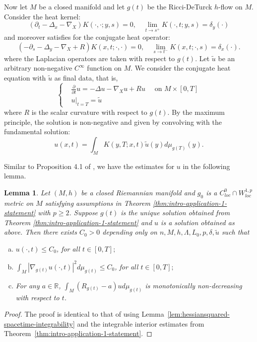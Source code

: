 \documentclass[12pt]{amsart}
\theoremstyle{plain}
\theoremstyle{plain}
\newtheorem{lemma}[subsection]{Lemma}
\theoremstyle{definition}
\theoremstyle{remark}
\numberwithin{equation}{subsection}
\newcommand{\del}{\nabla}
\begin{document}
Now let $M$ be a closed manifold and let $g(t)$ be the Ricci-DeTurck $h$-flow on $M$.
Consider the heat kernel:
\begin{equation*}
    \left(\partial_t - \Delta_x-\nabla_X\right)K(\cdot,\cdot;y,s) = 0, \quad \lim\limits_{t\to s^+}K(\cdot,t;y,s) = \delta_y(\cdot)
\end{equation*}
and moreover satisfies for the conjugate heat operator:
\begin{equation*}
    \left(-\partial_s - \Delta_y - \del_X + R\right)K(x,t;\cdot,\cdot) = 0, \quad \lim\limits_{s\to t^-}K(x,t;\cdot,s) = \delta_x(\cdot).
\end{equation*}
where the Laplacian operators are taken with respect to $g(t)$. Let $\tilde{u}$ be an arbitrary non-negative $C^\infty$ function on $M$. We consider the conjugate heat equation with $\tilde{u}$ as final data, that is,
\begin{equation}\label{eqn:conjugate-heat-eqn}
    \begin{cases}
        &\frac{\partial}{\partial t} u = -\Delta u - \del_X u + Ru \quad \text{ on } M \times[0,T] \\
        &u\big|_{t=T} = \tilde{u}
    \end{cases}
\end{equation}
where $R$ is the scalar curvature with respect to $g(t)$. By the maximum principle, the solution is non-negative and given by convolving with the fundamental solution:
\begin{equation*}
    u(x,t) = \int_M K(y,T;x,t)\tilde{u}(y)d\mu_{g(T)}(y).
\end{equation*}

Similar to Proposition 4.1 of \cite{jiang_weak_2021}, we have the estimates for $u$ in the following lemma.
\begin{lemma}\label{lem:conjugate-heat-equation-estimates}
    Let $(M,h)$ be a closed Riemannian manifold and $g_0$ is a $C^0_{loc}\cap W^{1,p}_{loc}$ metric on $M$ satisfying assumptions in Theorem \ref{thm:intro-application-1-statement} with $p\geq 2$. Suppose $g(t)$ is the unique solution obtained from Theorem \ref{thm:intro-application-1-statement} and $u$ is a solution obtained as above. Then there exists $C_0>0$ depending only on $n,M,h,\Lambda,L_0,p,\delta,\tilde u$ such that
    \begin{enumerate}[(a)]
        \item $u(\cdot,t) \leq C_0$, for all $t \in [0,T];$
        \item $\displaystyle\int_M |\del_{g(t)} u(\cdot,t)|^2 d\mu_{g(t)} \leq C_0$, for all $t \in [0,T];$
        \item For any $a\in \mathbb{R}$, $\displaystyle\int_M (R_{g(t)} - a)u d\mu_{g(t)}$ is monotonically non-decreasing with respect to $t$.
    \end{enumerate}
\end{lemma}
\begin{proof}
The proof is identical to that of \cite[Proposition 4.1]{jiang_weak_2021} using Lemma~\ref{lem:hessiansquared-spacetime-integrability} and the integrable interior estimates from Theorem~\ref{thm:intro-application-1-statement}.
\end{proof}
\end{document}
